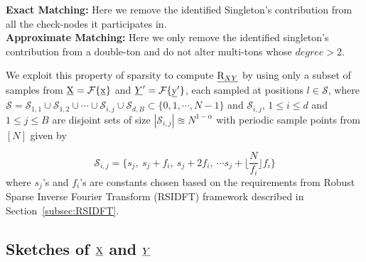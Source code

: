 \begin{enumerate}
\begin{itemize}
{\bf Exact Matching:} Here we remove the identified Singleton's contribution from all the check-nodes it participates in.			  \\
{\bf Approximate Matching:} Here we only remove the identified singleton's contribution from a double-ton and do not alter multi-tons whose $degree > 2$.
\end{itemize} 
		 
 We exploit this property of sparsity to compute $\underline{\mathrm{R}_{XY}}$ by using only a subset of samples from $\underline{\mathrm{X}} = \mathcal{F}\{\underline{\mathrm{x}}\} $ and $\underline{Y}' = \mathcal{F}\{\underline{\mathrm{y}}'\} $, each sampled at positions $l \in \mathcal{S}$, where $\mathcal{S} = \mathcal{S}_{1,1} \cup \mathcal{S}_{1,2} \cup \cdots \cup \mathcal{S}_{i,j} \cup  \mathcal{S}_{d,B} \subset \{ 0,1,\cdots ,N-1 \}$ and $\mathcal{S}_{i,j}$, $1 \leq i \leq d $ and  $1 \leq j \leq B $ are disjoint sets of size $|\mathcal{S}_{i,j}| \approxeq N^{1-\alpha}$ with periodic sample points from $[N]$ given by 
 
 \begin{equation}
 \label{eqn:sampling_sets}\mathcal{S}_{i,j} = \{s_j,\ s_j + f_i,\ s_j + 2f_i,\ \cdots s_j + \lfloor{\frac{N}{f_i} }\rfloor f_i \}
 \end{equation}
   where $s_j$'s and $f_i$'s are constants chosen based on the requirements from Robust Sparse Inverse Fourier Transform (RSIDFT) framework described in Section~\ref{subsec:RSIDFT}.

\subsection{Sketches of $\underline{\mathrm{X}}$ and $\underline{Y}$} 
\label{subsec:skteches}


\end{enumerate}
